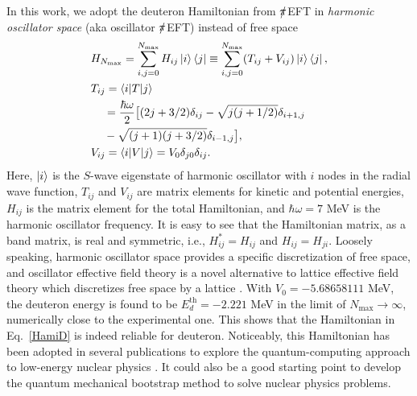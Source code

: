 \documentclass[aps,prc,reprint,superscriptaddress,nofootinbib]{revtex4-2}
\begin{document}
In this work, we adopt the deuteron Hamiltonian from $\slashed{\pi}$EFT in \emph{harmonic oscillator space} (aka oscillator $\slashed{\pi}$EFT)  instead of free space \cite{Dumitrescu:2018njn,Binder:2015trg,Bansal:2017pwn}
\begin{align}
&H_{N_\text{max}}=\sum_{i,j=0}^{N_\text{max}}H_{ij}\ket{i}\bra{j}%
\equiv\sum_{i,j=0}^{N_\text{max}}(T_{ij}+V_{ij})\ket{i}\bra{j},
\label{HamiD}\\
&T_{ij}=\braket{i|T|j}\nonumber\\
&\ \ \ \,=\frac{\hbar\omega}{2}\big[(2j+3/2)\delta_{ij}-\sqrt{j(j+1/2)}\delta_{i+1,j}\nonumber\\
&\ \ \ \,-\sqrt{(j+1)(j+3/2)}\delta_{i-1,j}\big],\\
&V_{ij}=\braket{i|V|j}=V_0\delta_{j0}\delta_{ij}.
\end{align}
Here, $\ket{i}$ is the $S$-wave eigenstate of harmonic oscillator with $i$ nodes in the radial wave function,
$T_{ij}$ and $V_{ij}$ are matrix elements for kinetic and potential energies,
$H_{ij}$ is the matrix element for the total Hamiltonian,
and $\hbar\omega=7$ MeV is the harmonic oscillator frequency.
It is easy to see that the Hamiltonian matrix, as a band matrix, is real and symmetric,
i.e., $H_{ij}^*=H_{ij}$ and $H_{ij}=H_{ji}$. 
Loosely speaking, harmonic oscillator space provides a specific discretization of 
free space, and oscillator effective field theory is a novel alternative to 
lattice effective field theory which discretizes free space by a lattice \cite{Binder:2015trg,Bansal:2017pwn,Yang:2016brl}.
With $V_0=-5.68658111$ MeV,
the deuteron energy is found to be $E_d^\text{th}=-2.221$ MeV in the limit of $N_\text{max}\to\infty$, numerically close to the experimental one.
This shows that the Hamiltonian in Eq.~\eqref{HamiD} is indeed reliable for deuteron.
Noticeably, this Hamiltonian has been adopted in several publications to explore the quantum-computing approach to 
low-energy nuclear physics \cite{Dumitrescu:2018njn,Siwach:2021tym}. 
It could also be a good starting point to develop the quantum mechanical bootstrap method to
solve nuclear physics problems.
\end{document}
